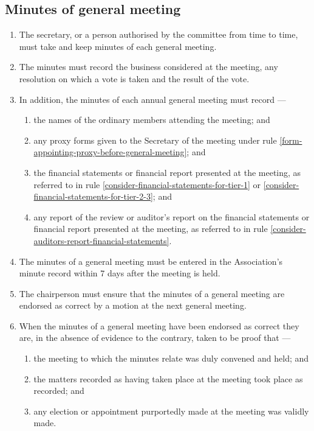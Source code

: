 \documentclass[../constitution.tex]{subfiles}
\begin{document}
\hypertarget{minutes-of-general-meeting}{%
\subsection{Minutes of general meeting}\label{minutes-of-general-meeting}}

\begin{enumerate}

\item The secretary, or a person authorised by the committee from time to time, must take and keep minutes of each general meeting.
\item The minutes must record the business considered at the meeting, any resolution on which a vote is taken and the result of the vote.
\item In addition, the minutes of each annual general meeting must record ---

  \begin{enumerate}
  
  \item the names of the ordinary members attending the meeting; and
  \item any proxy forms given to the Secretary of the meeting under rule \ref{form-appointing-proxy-before-general-meeting}; and
  \item the financial statements or financial report presented at the meeting, as referred to in rule \ref{consider-financial-statements-for-tier-1} or \ref{consider-financial-statements-for-tier-2-3}; and
  \item any report of the review or auditor's report on the financial statements or financial report presented at the meeting, as referred to in rule \ref{consider-auditors-report-financial-statements}.
  \end{enumerate}
\item The minutes of a general meeting must be entered in the Association's minute record within 7 days after the meeting is held.
\item The chairperson must ensure that the minutes of a general meeting are endorsed as correct by a motion at the next general meeting.



\item When the minutes of a general meeting have been endorsed as correct they are, in the absence of evidence to the contrary, taken to be proof that ---

  \begin{enumerate}
  
  \item the meeting to which the minutes relate was duly convened and held; and
  \item the matters recorded as having taken place at the meeting took place as recorded; and
  \item any election or appointment purportedly made at the meeting was validly made.
  \end{enumerate}
\end{enumerate}
\end{document}
